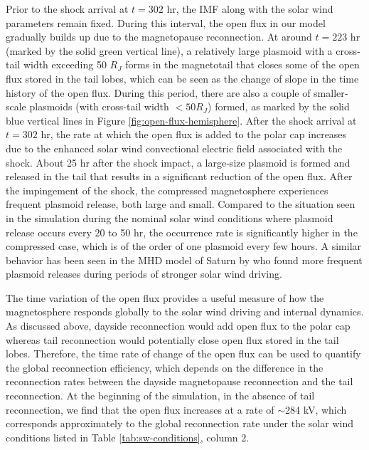Prior to the shock arrival at $t = 302$ hr, the IMF along with the solar wind parameters remain fixed. During this interval, the open flux in our model gradually builds up due to the magnetopause reconnection. At around $t = 223$ hr (marked by the solid green vertical line), a relatively large plasmoid with a cross‐tail width exceeding 50 $R_J$ forms in the magnetotail that closes some of the open flux stored in the tail lobes, which can be seen as the change of slope in the time history of the open flux. During this period, there are also a couple of smaller‐scale plasmoids (with cross‐tail width $<50 R_J$) formed, as marked by the solid blue vertical lines in Figure \ref{fig:open-flux-hemisphere}. After the shock arrival at $t = 302$ hr, the rate at which the open flux is added to the polar cap increases due to the enhanced solar wind convectional electric field associated with the shock. About 25 hr after the shock impact, a large‐size plasmoid is formed and released in the tail that results in a significant reduction of the open flux. After the impingement of the shock, the compressed magnetosphere experiences frequent plasmoid release, both large and small. Compared to the situation seen in the simulation during the nominal solar wind conditions where plasmoid release occurs every 20 to 50 hr, the occurrence rate is significantly higher in the compressed case, which is of the order of one plasmoid every few hours. A similar behavior has been seen in the MHD model of Saturn by \cite{Jia2012} who found more frequent plasmoid releases during periods of stronger solar wind driving. 

The time variation of the open flux provides a useful measure of how the magnetosphere responds globally to the solar wind driving and internal dynamics. As discussed above, dayside reconnection would add open flux to the polar cap whereas tail reconnection would potentially close open flux stored in the tail lobes. Therefore, the time rate of change of the open flux can be used to quantify the global reconnection efficiency, which depends on the difference in the reconnection rates between the dayside magnetopause reconnection and the tail reconnection. At the beginning of the simulation, in the absence of tail reconnection, we find that the open flux increases at a rate of $\sim$284 kV, which corresponds approximately to the global reconnection rate under the solar wind conditions listed in Table \ref{tab:sw-conditions}, column 2.

